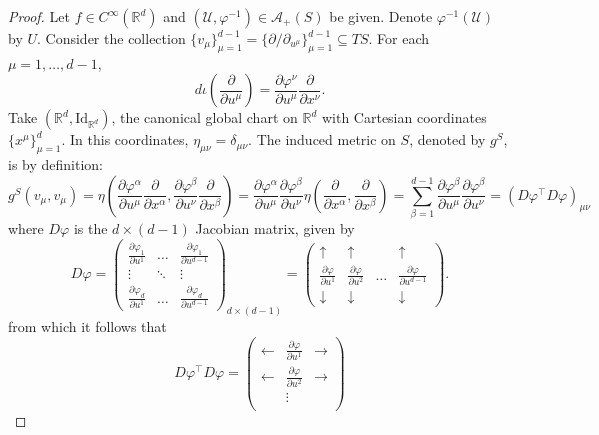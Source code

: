 \documentclass{article}
\newcommand{\p}{\partial}
\newcommand{\R}{\mathbb{R}}
\newcommand{\al}{\alpha}
\newcommand{\be}{\beta}
\newcommand{\f}[2]{\frac{#1}{#2}}
\newcommand{\lp}{\left(}
\newcommand{\rp}{\right)}
\theoremstyle{theorem}
\begin{document}
\begin{proof}
Let $f\in C^\infty(\R^d)$ and $(\mathcal{U}, \varphi^{-1}) \in \mathcal{A}_+(S)$ be given. Denote $\varphi^{-1}(\mathcal{U})$ by $U$. Consider the collection $\{ v_\mu \}_{\mu = 1}^{d-1} = \{ \p/\p_{u^\mu} \}_{\mu = 1}^{d-1} \subseteq TS$. For each $\mu = 1,\dots,d-1$,
\begin{equation*}
    d\iota\lp \f{\p}{\p u^\mu} \rp = \f{\p \varphi^\nu}{\p u^\mu} \f{\p}{\p x^\nu}.
\end{equation*}
Take $(\R^d, \text{Id}_{\R^d})$, the canonical global chart on $\R^d$ with Cartesian coordinates $\{ x^\mu \}_{\mu = 1}^d$. In this coordinates, $\eta_{\mu\nu} = \delta_{\mu\nu}$. The induced metric on $S$, denoted by $g^S$, is by definition:
\begin{equation*}
    g^S(v_\mu, v_\mu) = \eta\lp \f{\p \varphi^\al}{\p u^\mu} \f{\p}{\p x^\al}, \f{\p \varphi^\be}{\p u^\nu} \f{\p}{\p x^\be} \rp = \f{\p \varphi^\al}{\p u^\mu}\f{\p \varphi^\be}{\p u^\nu} \eta\lp \f{\p}{\p x^\al}, \f{\p}{\p x^\be} \rp
    = \sum_{\be = 1}^{d-1}\f{\p \varphi^\be}{\p u^\mu}\f{\p \varphi^\be}{\p u^\nu} = (D\varphi^\top D\varphi)_{\mu\nu}
\end{equation*}
where $D\varphi$ is the $d\times (d-1)$ Jacobian matrix, given by
\begin{equation*}
    D\varphi = \begin{pmatrix}
    \f{\p \varphi_1}{\p u^1} & \dots & \f{\p \varphi_1}{\p u^{d-1}} \\
    \vdots &\ddots & \vdots\\
    \f{\p \varphi_{d}}{\p u^1} & \dots & \f{\p \varphi_{d}}{\p u^{d-1}} 
    \end{pmatrix}_{d\times (d-1)} = \begin{pmatrix}
    \uparrow & \uparrow &   &\uparrow \\ 
    \f{\p \varphi}{\p u^1}& \f{\p \varphi}{\p u^2}  &\dots&\f{\p \varphi}{\p u^{d-1}}\\
    \downarrow  & \downarrow &    &\downarrow     \end{pmatrix}.
\end{equation*}
from which it follows that
\begin{equation*}
    D\varphi^\top D\varphi = \begin{pmatrix}
     \leftarrow & \f{\p \varphi}{\p u^1} & \rightarrow \\
     \leftarrow & \f{\p \varphi}{\p u^2} & \rightarrow \\
     &\vdots& \\

\end{pmatrix}
\end{equation*}
\end{proof}
\end{document}

